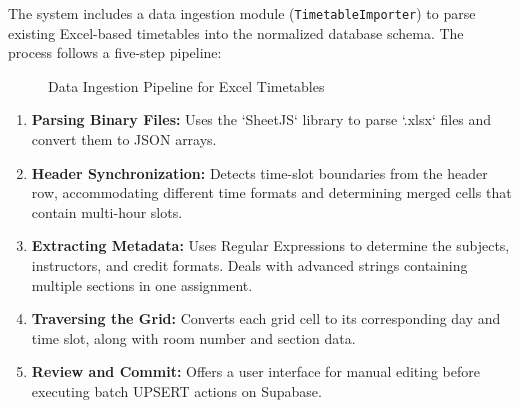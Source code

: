 The system includes a data ingestion module (\texttt{TimetableImporter}) to parse existing Excel-based timetables into the normalized database schema. The process follows a five-step pipeline:

\begin{figure}[H]
\centering
{}
\caption{Data Ingestion Pipeline for Excel Timetables}
\label{fig:parsing_pipeline}
\end{figure}

\begin{enumerate}
    \item \textbf{Parsing Binary Files:} Uses the `SheetJS` library to parse `.xlsx` files and convert them to JSON arrays.
    \item \textbf{Header Synchronization:} Detects time-slot boundaries from the header row, accommodating different time formats and determining merged cells that contain multi-hour slots.
    \item \textbf{Extracting Metadata:} Uses Regular Expressions to determine the subjects, instructors, and credit formats. Deals with advanced strings containing multiple sections in one assignment.
    \item \textbf{Traversing the Grid:} Converts each grid cell to its corresponding day and time slot, along with room number and section data.
    \item \textbf{Review and Commit:} Offers a user interface for manual editing before executing batch UPSERT actions on Supabase.
\end{enumerate}

